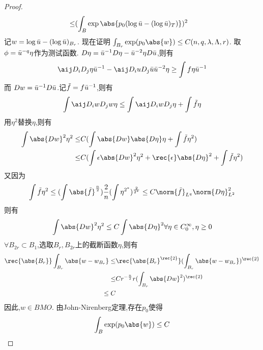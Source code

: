 \begin{proof}
\begin{equation}
\begin{split}
            \le & (\int_B \exp\abs{p_0(\log\ub-(\log\ub)_T)})^2
        \end{split}
    \end{equation}
    记$w=\log{\bar{u}}-(\log{\bar{u}})_{B_r}$. 现在证明 $\int_{B_r}\exp(p_0\abs{w}) \le C(n,q,\lambda,\Lambda,r)$. 取$\phi={\bar{u}}^{-q}\eta$作为测试函数. $D\eta={\bar{u}}^{-1}D\eta-{\bar{u}}^{-2}\eta D{\bar{u}}$,则有
    \begin{equation}
        \aij D_i D_j\eta \ub^{-1}-\aij D_iuD_j\ub \ub^{-2}\eta \ge \int f\eta \ub^{-1}
    \end{equation}
    而 $Dw={\bar{u}}^{-1}D{\bar{u}}$.记$\tilde{f}=f{\bar{u}}^{-1}$,则有
    \begin{equation}
        \int \aij D_iwD_jw \eta \le \int \aij D_iw D_j\eta + \int \tilde{f}\eta
    \end{equation}
    用$\eta^2$替换$\eta$,则有
    \begin{equation}
        \begin{split}
            \int \abs{Dw}^2\eta^2 \le &C(\int \abs{Dw}\abs{D\eta}\eta+ \int \tilde{f}\eta^2) \\
            \le & C(\int \epsilon\abs{Dw}^2\eta^2 +\rec{\epsilon}\abs{D\eta}^2+\int \tilde{f}\eta^2)
        \end{split}
    \end{equation}
    又因为
    \begin{equation}
        \int \tilde{f}\eta^2 \le (\int \abs{\tilde{f}}^\frac{{n}}{2})\frac{2}{n}(\int \eta^{2^*})^\frac{2}{2^*} \le C\norm{\tilde{f}}_{L^q}\norm{D\eta}^2_{L^2}
    \end{equation}
    则有 
    \begin{equation}
        \int \abs{Dw}^2\eta^2 \le C\int \abs{D\eta}^2 \forall \eta \in C^\infty_0, \eta \ge 0
    \end{equation}
    $\forall B_{2r} \subset B_1$,选取$B_{r},B_{2r}$上的截断函数$\eta$,则有
    \begin{equation}
        \begin{split}
            \rec{\abs{B_r}} \int_{B_r}\abs{w-w_{B_r}} \le & \rec{\abs{B_r}^\rec{2}}(\int_{B_r}\abs{w-w_{B_r}})^\rec{2} \\
            \le & Cr^{-\frac{n}{2}}r(\int_{B_r}\abs{Dw}^2)^\rec{2} \\
            \le C
        \end{split}
    \end{equation}
    因此,$w \in BMO$. 由John-Nirenberg定理,存在$p_0$使得
    \begin{equation}
        \int_B \exp(p_0\abs{w}) \le C

\end{equation}
\end{proof}
